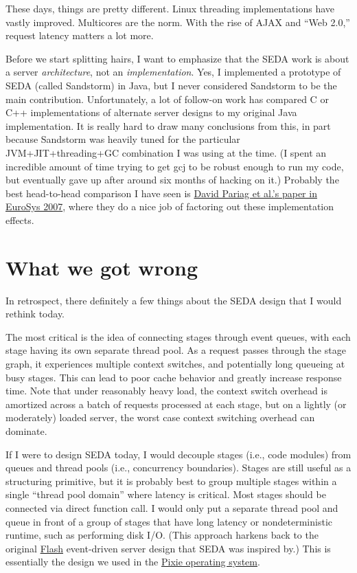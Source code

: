 \documentclass[a4paper,12pt,notitlepage,twoside,openright]{article}
\begin{document}
These days, things are pretty different. Linux threading implementations have vastly improved. Multicores are the norm. With the rise of AJAX and ``Web 2.0,'' request latency matters a lot more.

Before we start splitting hairs, I want to emphasize that the SEDA work is about a server \emph{architecture}, not an \emph{implementation}. Yes, I implemented a prototype of SEDA (called Sandstorm) in Java, but I never considered Sandstorm to be the main contribution. Unfortunately, a lot of follow-on work has compared C or C++ implementations of alternate server designs to my original Java implementation. It is really hard to draw many conclusions from this, in part because Sandstorm was heavily tuned for the particular JVM+JIT+threading+GC combination I was using at the time. (I spent an incredible amount of time trying to get gcj to be robust enough to run my code, but eventually gave up after around six months of hacking on it.) Probably the best head-to-head comparison I have seen is \href{http://www.cs.uwaterloo.ca/~brecht/papers/getpaper.php?file=eurosys-2007.pdf}{David Pariag et al.'s paper in EuroSys 2007}, where they do a nice job of factoring out these implementation effects.

\section{What we got wrong}

In retrospect, there definitely a few things about the SEDA design that I would rethink today.

The most critical is the idea of connecting stages through event queues, with each stage having its own separate thread pool. As a request passes through the stage graph, it experiences multiple context switches, and potentially long queueing at busy stages. This can lead to poor cache behavior and greatly increase response time. Note that under reasonably heavy load, the context switch overhead is amortized across a batch of requests processed at each stage, but on a lightly (or moderately) loaded server, the worst case context switching overhead can dominate.

If I were to design SEDA today, I would decouple stages (i.e., code modules) from queues and thread pools (i.e., concurrency boundaries). Stages are still useful as a structuring primitive, but it is probably best to group multiple stages within a single ``thread pool domain'' where latency is critical. Most stages should be connected via direct function call. I would only put a separate thread pool and queue in front of a group of stages that have long latency or nondeterministic runtime, such as performing disk I/O. (This approach harkens back to the original \href{http://www.cs.princeton.edu/~vivek/flash/}{Flash} event-driven server design that SEDA was inspired by.) This is essentially the design we used in the \href{http://fiji.eecs.harvard.edu/Pixie}{Pixie operating system}.
\end{document}
